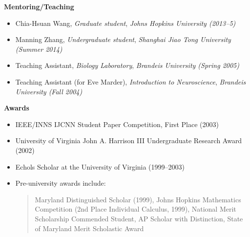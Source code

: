 \documentclass[10pt]{article}
\begin{document}
{\large \textbf{Mentoring/Teaching}}
\begin{itemize}
  \item Chia-Hsuan Wang, \emph{Graduate student}, \emph{Johns Hopkins University
(2013--5)}
  \item Manning Zhang, \emph{Undergraduate student}, \emph{Shanghai Jiao Tong
University (Summer 2014)}
  \item Teaching Assistant, \emph{Biology Laboratory}, \emph{Brandeis University
(Spring 2005)}
  \item Teaching Assistant (for Eve Marder), \emph{Introduction to
Neuroscience}, \emph{Brandeis University (Fall 2004)}
\end{itemize}

{\large \textbf{Awards}}
\begin{itemize}
  \item IEEE/INNS IJCNN Student Paper Competition, First Place (2003)
  \item University of Virginia John A. Harrison III Undergraduate Research Award (2002)
  \item Echols Scholar at the University of Virginia (1999--2003)
  \item Pre-university awards include:
\begin{quote}
Maryland Distinguished Scholar (1999), Johns Hopkins Mathematics Competition
(2nd Place Individual Calculus, 1999), National Merit Scholarship Commended
Student, AP Scholar with Distinction, State of Maryland Merit Scholastic Award
\end{quote}
\end{itemize}
\end{document}
